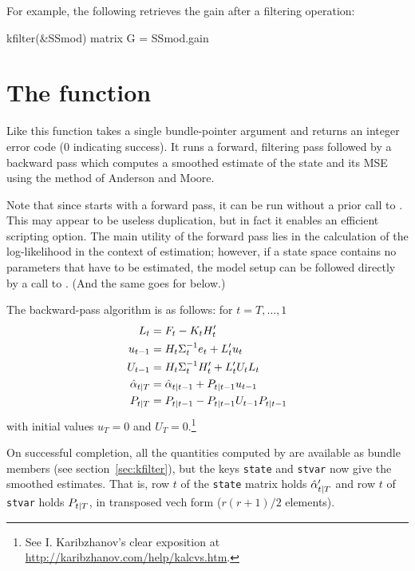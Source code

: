 \documentclass[a4paper]{article}
\begin{document}
For example, the following retrieves the gain after a filtering
operation:
%
\begin{code}
kfilter(&SSmod)
matrix G = SSmod.gain
\end{code}

\section{The  function}
\label{sec:ksmooth}

Like  this function takes a single bundle-pointer
argument and returns an integer error code (0 indicating success).  It
runs a forward, filtering pass followed by a backward pass which
computes a smoothed estimate of the state and its MSE using the method
of Anderson and Moore.

Note that since  starts with a forward pass, it can be
run without a prior call to . This may appear to be
useless duplication, but in fact it enables an efficient scripting
option.  The main utility of the forward pass lies in the calculation
of the log-likelihood in the context of estimation; however, if a
state space contains no parameters that have to be estimated, the
model setup can be followed directly by a call to . (And
the same goes for  below.)

The backward-pass algorithm is as follows: for $t=T,\dots,1$
%
\begin{align*}
L_t &= F_t - K_t H_t' \\
u_{t-1} &= H_t \Sigma_t^{-1} e_t 
 + L_t' u_t \\
U_{t-1} &= H_t \Sigma_t^{-1} H_t' + 
  L_t' U_t L_t \\
\hat{\alpha}_{t|T} &= \hat{\alpha}_{t|t-1} + 
  P_{t|t-1} u_{t-1} \\
P_{t|T} &= P_{t|t-1} - 
  P_{t|t-1} U_{t-1} P_{t|t-1}
\end{align*}
%
with initial values $u_T = 0$ and $U_T =
0$.\footnote{See I. Karibzhanov's clear exposition at
\url{http://karibzhanov.com/help/kalcvs.htm}.}

On successful completion, all the quantities computed by
 are available as bundle members (see
section~\ref{sec:kfilter}), but the keys \texttt{state} and
\texttt{stvar} now give the smoothed estimates.  That is, row $t$ of
the \texttt{state} matrix holds $\hat{\alpha}_{t|T}'$ and row $t$
of \texttt{stvar} holds $P_{t|T}$, in transposed vech form
($r(r+1)/2$ elements).
\end{document}
